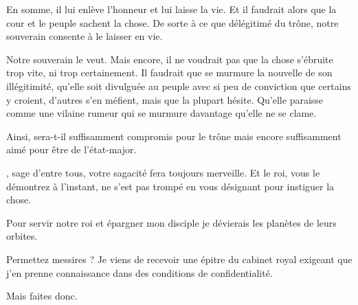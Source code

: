 \begin{drama}
  \alexasspeaks En somme, il lui enlève l’honneur et lui laisse la vie. Et il faudrait alors que la cour et le peuple sachent la chose. De sorte à ce que délégitimé du trône, notre souverain consente à le laisser en vie.

  \generalspeaks Notre souverain le veut. Mais encore, il ne voudrait pas que la chose s’ébruite trop vite, ni trop certainement. Il faudrait que se murmure la nouvelle de son illégitimité, qu’elle soit divulguée au peuple avec si peu de conviction que certains y croient, d’autres s’en méfient, mais que la plupart hésite. Qu’elle paraisse comme une vilaine rumeur qui se murmure davantage qu’elle ne se clame.

  \elenaspeaks Ainsi,  sera-t-il suffisamment compromis pour le trône mais encore suffisamment aimé pour être de l’état-major.

  \generalspeaks \alexas, sage d’entre tous, votre sagacité fera toujours merveille. Et le roi, vous le démontrez à l’instant, ne s’est pas trompé en  vous désignant pour instiguer la chose.

  \alexasspeaks Pour servir notre roi et épargner mon disciple je dévierais les planètes de leurs orbites.


  \alexasspeaks Permettez messires ? Je viens de recevoir une épitre du cabinet royal exigeant que  j’en prenne connaissance dans des conditions de confidentialité.

  \generalspeaks Mais faites donc.
\end{drama}

\scene

\StageDirII{\elena, \general}


